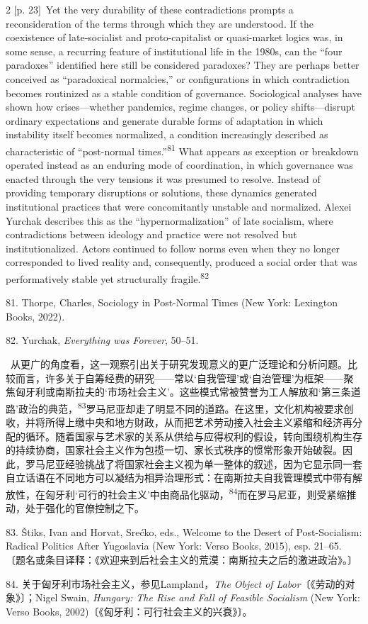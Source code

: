 \documentclass[10pt,a4paper]{article}
\begin{document}
\begin{paracol}{2}
{\scriptsize\color{gray} [p. 23]}\ Yet the very durability of these contradictions prompts a reconsideration of the terms through which they are understood. If the coexistence of late-socialist and proto-capitalist or quasi-market logics was, in some sense, a recurring feature of institutional life in the 1980s, can the “four paradoxes” identified here still be considered paradoxes? They are perhaps better conceived as “paradoxical normalcies,” or configurations in which contradiction becomes routinized as a stable condition of governance. Sociological analyses have shown how crises—whether pandemics, regime changes, or policy shifts—disrupt ordinary expectations and generate durable forms of adaptation in which instability itself becomes normalized, a condition increasingly described as characteristic of “post-normal times.”\nobreak\textsuperscript{81} What appears as exception or breakdown operated instead as an enduring mode of coordination, in which governance was enacted through the very tensions it was presumed to resolve. Instead of providing temporary disruptions or solutions, these dynamics generated institutional practices that were concomitantly unstable and normalized. Alexei Yurchak describes this as the “hypernormalization” of late socialism, where contradictions between ideology and practice were not resolved but institutionalized. Actors continued to follow norms even when they no longer corresponded to lived reality and, consequently, produced a social order that was performatively stable yet structurally fragile.\nobreak\textsuperscript{82}\par{\small 81. Thorpe, Charles, Sociology in Post-Normal Times (New York: Lexington Books, 2022).\par}{\small 82. Yurchak, \textit{Everything was Forever}, 50–51.\par}
\switchcolumn*
{\scriptsize\color{gray} [p. 23]}\ 从更广的角度看，这一观察引出关于研究发现意义的更广泛理论和分析问题。比较而言，许多关于自筹经费的研究——常以‘自我管理’或‘自治管理’为框架——聚焦匈牙利或南斯拉夫的‘市场社会主义’。这些模式常被赞誉为工人解放和‘第三条道路’政治的典范，\nobreak\textsuperscript{83}罗马尼亚却走了明显不同的道路。在这里，文化机构被要求创收，并将所得上缴中央和地方财政，从而把艺术劳动接入社会主义紧缩和经济再分配的循环。随着国家与艺术家的关系从供给与应得权利的假设，转向围绕机构生存的持续协商，国家社会主义作为包揽一切、家长式秩序的惯常形象开始破裂。因此，罗马尼亚经验挑战了将国家社会主义视为单一整体的叙述，因为它显示同一套自立话语在不同地方可以凝结为相异治理形式：在南斯拉夫自我管理模式中带有解放性，在匈牙利‘可行的社会主义’中由商品化驱动，\nobreak\textsuperscript{84}而在罗马尼亚，则受紧缩推动，处于强化的官僚控制之下。\par{\small 83. Štiks, Ivan and Horvat, Srećko, eds., Welcome to the Desert of Post-Socialism: Radical Politics After Yugoslavia (New York: Verso Books, 2015), esp. 21–65. 〔题名或条目译释：《欢迎来到后社会主义的荒漠：南斯拉夫之后的激进政治》。〕\par}{\small 84. 关于匈牙利市场社会主义，参见Lampland，\textit{The Object of Labor}〔《劳动的对象》〕；Nigel Swain, \textit{Hungary: The Rise and Fall of Feasible Socialism} (New York: Verso Books, 2002)〔《匈牙利：可行社会主义的兴衰》〕。\par}

\end{paracol}
\end{document}
